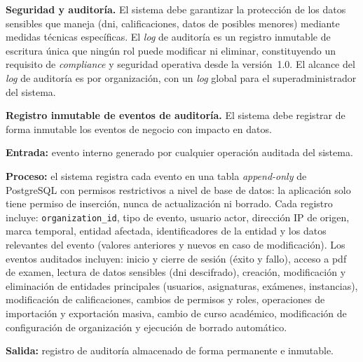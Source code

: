 
\item \textbf{Seguridad y auditoría.} \label{rf:security}
El sistema debe garantizar la protección de los datos sensibles que maneja (\acs{dni},
calificaciones, datos de posibles menores) mediante medidas técnicas específicas. El
\textit{log} de auditoría es un registro inmutable de escritura única que ningún rol puede
modificar ni eliminar, constituyendo un requisito de \textit{compliance} y seguridad
operativa desde la versión~1.0. El alcance del \textit{log} de auditoría es por
organización, con un \textit{log} global para el superadministrador del sistema.

\begin{functional}

    \item \textbf{Registro inmutable de eventos de auditoría.}
    \label{rf:sec:audit}
    El sistema debe registrar de forma inmutable los eventos de negocio con impacto en
    datos.

    \textbf{Entrada:} evento interno generado por cualquier operación auditada del sistema.

    \textbf{Proceso:} el sistema registra cada evento en una tabla \textit{append-only} de
    PostgreSQL con permisos restrictivos a nivel de base de datos: la aplicación solo tiene
    permiso de inserción, nunca de actualización ni borrado. Cada registro incluye:
    \texttt{organization\_id}, tipo de evento, usuario actor, dirección IP de origen, marca
    temporal, entidad afectada, identificadores de la entidad y los datos relevantes del
    evento (valores anteriores y nuevos en caso de modificación). Los eventos auditados
    incluyen: inicio y cierre de sesión (éxito y fallo), acceso a \acs{pdf} de examen,
    lectura de datos sensibles (\acs{dni} descifrado), creación, modificación y eliminación
    de entidades principales (usuarios, asignaturas, exámenes, instancias), modificación de
    calificaciones, cambios de permisos y roles, operaciones de importación y exportación
    masiva, cambio de curso académico, modificación de configuración de organización y
    ejecución de borrado automático.

    \textbf{Salida:} registro de auditoría almacenado de forma permanente e inmutable.


\end{functional}
